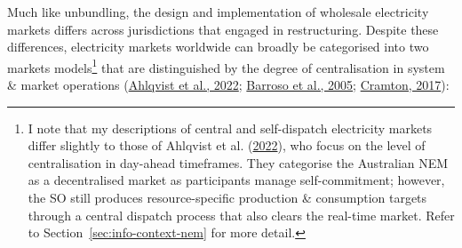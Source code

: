 \documentclass[12pt,a4paper,]{report}
\begin{document}
Much like unbundling, the design and implementation of wholesale
electricity markets differs across jurisdictions that engaged in
restructuring. Despite these differences, electricity markets worldwide
can broadly be categorised into two markets models\footnote{I note that
  my descriptions of central and self-dispatch electricity markets
  differ slightly to those of Ahlqvist et al.
  (\protect\hyperlink{ref-ahlqvistSurveyComparingCentralized2022}{2022}),
  who focus on the level of centralisation in day-ahead timeframes. They
  categorise the Australian NEM as a decentralised market as
  participants manage self-commitment; however, the SO still produces
  resource-specific production \& consumption targets through a central
  dispatch process that also clears the real-time market. Refer to
  Section~\ref{sec:info-context-nem} for more detail.} that are
distinguished by the degree of centralisation in system \& market
operations
(\protect\hyperlink{ref-ahlqvistSurveyComparingCentralized2022}{Ahlqvist
et al., 2022};
\protect\hyperlink{ref-barrosoClassificationElectricityMarket2005}{Barroso
et al., 2005};
\protect\hyperlink{ref-cramtonElectricityMarketDesign2017}{Cramton,
2017}):
\end{document}
